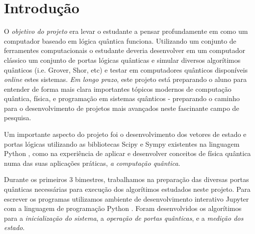 \documentclass[12pt,a4paper]{article}
\begin{document}



\section{Introdução}
O \textit{objetivo do projeto }era levar o estudante a pensar profundamente em como um computador baseado em lógica quântica funciona. Utilizando um conjunto de ferramentes computacionais o estudante deveria desenvolver em um computador clássico um conjunto de portas lógicas quânticas e simular diversos algorítimos quânticos (i.e. Grover\cite{Grover1996ASearch}, Shor\cite{Shor1997Polynomial-timeComputer}, etc) e testar em computadores quânticos disponíveis \textit{online} estes sistemas. \textit{Em longo prazo}, este projeto está preparando o aluno para entender de forma mais clara importantes  tópicos modernos de computação quântica, física, e programação em sistemas quânticos - preparando o caminho  para o desenvolvimento de projetos mais avançados neste fascinante campo de pesquisa.

Um importante aspecto do projeto foi o desenvolvimento dos vetores de estado e portas lógicas utilizando as bibliotecas  Scipy e Sympy existentes na linguagem Python \cite{Rossum2011}, como na experiência de aplicar e desenvolver conceitos de física quântica numa das suas aplicações práticas, \textit{a computação quântica}. 

Durante os primeiros 3 bimestres, trabalhamos na preparação das diversas portas quânticas necessárias para execução dos algorítimos estudados neste projeto.  Para escrever os programas utilizamos ambiente de desenvolvimento interativo Jupyter \cite{Kluyver2016} com a linguagem de programação Python \cite{Rossum2011}. Foram desenvolvidos os algorítimos para a \textit{inicialização do sistema}, a \textit{operação de portas quânticas}, e a \textit{medição dos estado}. 
\end{document}
